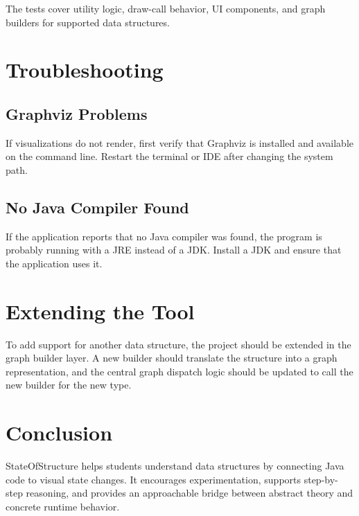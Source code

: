 \documentclass[12pt,a4paper]{article}
\begin{document}
The tests cover utility logic, draw-call behavior, UI components, and graph builders for supported data structures.

\section{Troubleshooting}

\subsection{Graphviz Problems}

If visualizations do not render, first verify that Graphviz is installed and available on the command line. Restart the terminal or IDE after changing the system path.

\subsection{No Java Compiler Found}

If the application reports that no Java compiler was found, the program is probably running with a JRE instead of a JDK. Install a JDK and ensure that the application uses it.


\section{Extending the Tool}

To add support for another data structure, the project should be extended in the graph builder layer. A new builder should translate the structure into a graph representation, and the central graph dispatch logic should be updated to call the new builder for the new type.

\section{Conclusion}

StateOfStructure helps students understand data structures by connecting Java code to visual state changes. It encourages experimentation, supports step-by-step reasoning, and provides an approachable bridge between abstract theory and concrete runtime behavior.
\end{document}
